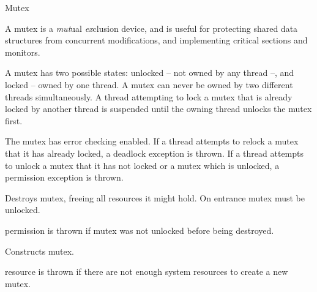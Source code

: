 
\begin{classpage}{Mutex}
  
A mutex is a {\em mut}ual {\em ex}clusion device, and is useful for
protecting shared data structures from concurrent modifications, and
implementing critical sections and monitors.

A mutex has two possible states: unlocked -- not owned by any thread
--, and locked -- owned by one thread. A mutex can never be owned by
two different threads simultaneously.  A thread attempting to lock a
mutex that is already locked by another thread is suspended until the
owning thread unlocks the mutex first.

The mutex has error checking enabled. If a thread attempts to relock
a mutex that it has already locked, a deadlock exception is thrown.
If a thread attempts to unlock a mutex that it has not locked or a mutex which is unlocked, a permission exception is thrown.


\begin{mandescription}
  \destructor
  Destroys  mutex, freeing all resources it might
  hold. On entrance  mutex must be unlocked.
  \begin{exception}
    \item[permission] is thrown if  mutex was
      not unlocked before being destroyed.
  \end{exception}

  \constructor{}
  Constructs  mutex.
  \begin{exception}
    \item[resource] is thrown if there are not
      enough system resources to create a new mutex.
  \end{exception}


\end{mandescription}
\end{classpage}
